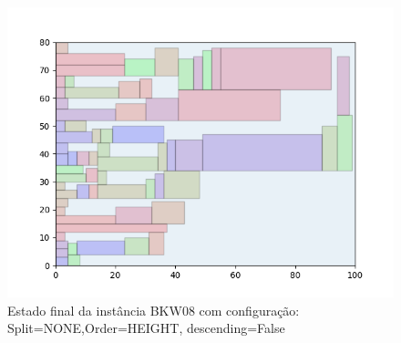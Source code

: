 \begin{figure}[H]
    \centering
    \caption[]{Estado final da instância BKW08 com configuração: Split=NONE,Order=HEIGHT, descending=False}
    \label{fig:bkw08-none-height-false}
    \includegraphics[scale=0.5]{output/figures/bkw/bkw08/none/height/false/00}
\end{figure}